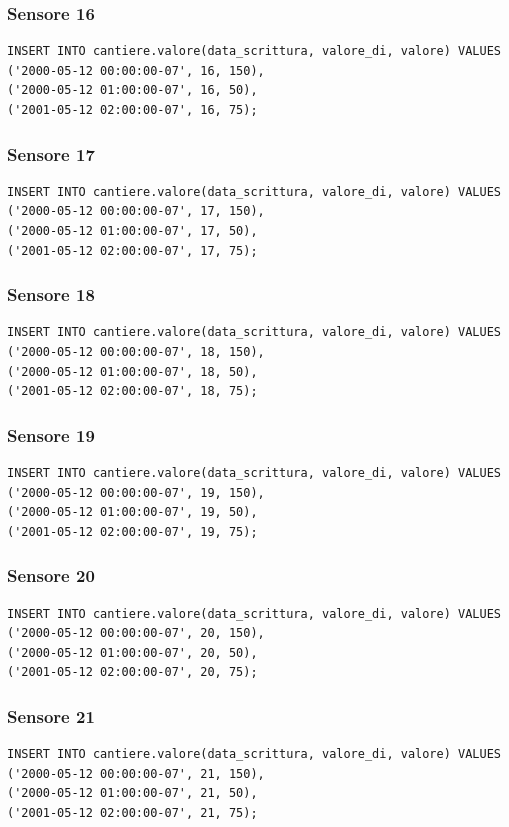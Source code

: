 \documentclass[11pt]{article}
\begin{document}
\subsubsection*{Sensore 16}
\label{sec:org848921a}
\begin{verbatim}
INSERT INTO cantiere.valore(data_scrittura, valore_di, valore) VALUES
('2000-05-12 00:00:00-07', 16, 150),
('2000-05-12 01:00:00-07', 16, 50),
('2001-05-12 02:00:00-07', 16, 75);
\end{verbatim}
\subsubsection*{Sensore 17}
\label{sec:org9fc0628}
\begin{verbatim}
INSERT INTO cantiere.valore(data_scrittura, valore_di, valore) VALUES
('2000-05-12 00:00:00-07', 17, 150),
('2000-05-12 01:00:00-07', 17, 50),
('2001-05-12 02:00:00-07', 17, 75);
\end{verbatim}
\subsubsection*{Sensore 18}
\label{sec:org4b1cdf2}
\begin{verbatim}
INSERT INTO cantiere.valore(data_scrittura, valore_di, valore) VALUES
('2000-05-12 00:00:00-07', 18, 150),
('2000-05-12 01:00:00-07', 18, 50),
('2001-05-12 02:00:00-07', 18, 75);
\end{verbatim}
\subsubsection*{Sensore 19}
\label{sec:org4f06596}
\begin{verbatim}
INSERT INTO cantiere.valore(data_scrittura, valore_di, valore) VALUES
('2000-05-12 00:00:00-07', 19, 150),
('2000-05-12 01:00:00-07', 19, 50),
('2001-05-12 02:00:00-07', 19, 75);
\end{verbatim}
\subsubsection*{Sensore 20}
\label{sec:org6182de0}
\begin{verbatim}
INSERT INTO cantiere.valore(data_scrittura, valore_di, valore) VALUES
('2000-05-12 00:00:00-07', 20, 150),
('2000-05-12 01:00:00-07', 20, 50),
('2001-05-12 02:00:00-07', 20, 75);
\end{verbatim}
\subsubsection*{Sensore 21}
\label{sec:org0347587}
\begin{verbatim}
INSERT INTO cantiere.valore(data_scrittura, valore_di, valore) VALUES
('2000-05-12 00:00:00-07', 21, 150),
('2000-05-12 01:00:00-07', 21, 50),
('2001-05-12 02:00:00-07', 21, 75);
\end{verbatim}
\end{document}
